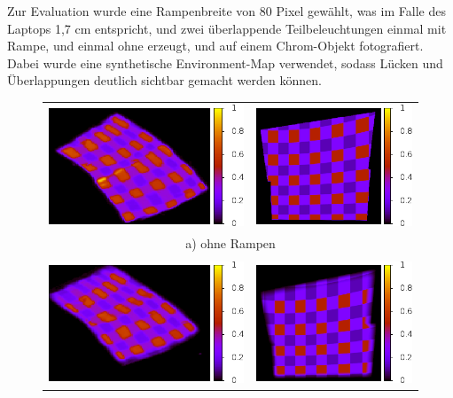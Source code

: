       Zur Evaluation wurde eine Rampenbreite von 80 Pixel gewählt, was im Falle des Laptops 1,7 cm entspricht, und zwei überlappende Teilbeleuchtungen einmal mit Rampe, und einmal ohne erzeugt, und auf einem Chrom-Objekt fotografiert.
      Dabei wurde eine synthetische Environment-Map verwendet, sodass Lücken und Überlappungen deutlich sichtbar gemacht werden können.
        


   \begin{figure}[h]
    \centering
    \begin{tabular}{cc} 
     \includegraphics[height=0.25\textwidth]{../graphics/beleuchtung/overlap_eval_0_map.png} &
     \includegraphics[height=0.25\textwidth]{../graphics/beleuchtung/overlap_eval_0_cube_map.png} \\
      \multicolumn{2}{c}{  a) ohne Rampen } \\
    & \\
     \includegraphics[height=0.25\textwidth]{../graphics/beleuchtung/overlap_eval_80_map.png} &
     \includegraphics[height=0.25\textwidth]{../graphics/beleuchtung/overlap_eval_80_cube_map.png} \\

\end{tabular}
\end{figure}
